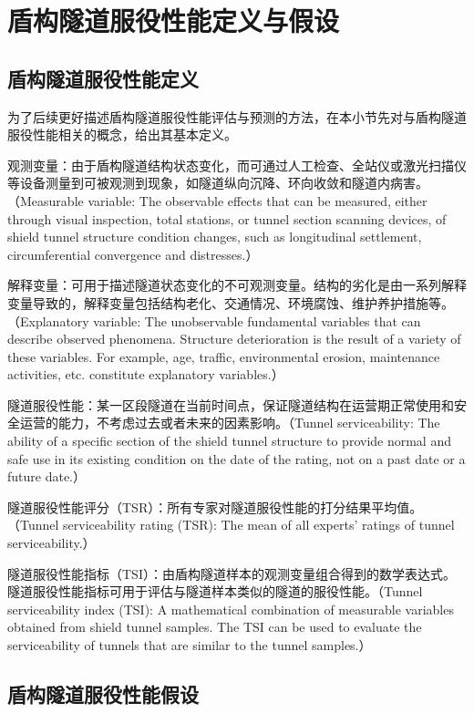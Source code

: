 \section{盾构隧道服役性能定义与假设}

\subsection{盾构隧道服役性能定义}

为了后续更好描述盾构隧道服役性能评估与预测的方法，在本小节先对与盾构隧道服役性能相关的概念，给出其基本定义。

观测变量：由于盾构隧道结构状态变化，而可通过人工检查、全站仪或激光扫描仪等设备测量到可被观测到现象，如隧道纵向沉降、环向收敛和隧道内病害。（Measurable variable: The observable effects that can be measured, either through visual inspection, total stations, or tunnel section scanning devices, of shield tunnel structure condition changes, such as longitudinal settlement, circumferential convergence and distresses.）

解释变量：可用于描述隧道状态变化的不可观测变量。结构的劣化是由一系列解释变量导致的，解释变量包括结构老化、交通情况、环境腐蚀、维护养护措施等。（Explanatory variable: The unobservable fundamental variables that can describe observed phenomena. Structure deterioration is the result of a variety of these variables. For example, age, traffic, environmental erosion, maintenance activities, etc. constitute explanatory variables.）

隧道服役性能：某一区段隧道在当前时间点，保证隧道结构在运营期正常使用和安全运营的能力，不考虑过去或者未来的因素影响。（Tunnel serviceability: The ability of a speciﬁc section of the shield tunnel structure to provide normal and safe use in its existing condition on the date of the rating, not on a past date or a future date.）

隧道服役性能评分（TSR）：所有专家对隧道服役性能的打分结果平均值。（Tunnel serviceability rating (TSR): The mean of all experts' ratings of tunnel serviceability.）

隧道服役性能指标（TSI）：由盾构隧道样本的观测变量组合得到的数学表达式。隧道服役性能指标可用于评估与隧道样本类似的隧道的服役性能。（Tunnel serviceability index (TSI): A mathematical combination of measurable variables obtained from shield tunnel samples. The TSI can be used to evaluate the serviceability of tunnels that are similar to the tunnel samples.）

\subsection{盾构隧道服役性能假设}

